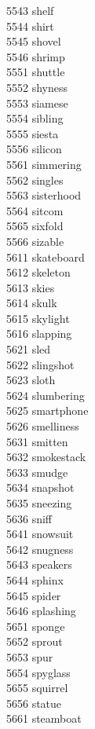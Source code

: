 5543 shelf \\
5544 shirt \\
5545 shovel \\
5546 shrimp \\
5551 shuttle \\
5552 shyness \\
5553 siamese \\
5554 sibling \\
5555 siesta \\
5556 silicon \\
5561 simmering \\
5562 singles \\
5563 sisterhood \\
5564 sitcom \\
5565 sixfold \\
5566 sizable \\
5611 skateboard \\
5612 skeleton \\
5613 skies \\
5614 skulk \\
5615 skylight \\
5616 slapping \\
5621 sled \\
5622 slingshot \\
5623 sloth \columnbreak \\
5624 slumbering \\
5625 smartphone \\
5626 smelliness \\
5631 smitten \\
5632 smokestack \\
5633 smudge \\
5634 snapshot \\
5635 sneezing \\
5636 sniff \\
5641 snowsuit \\
5642 snugness \\
5643 speakers \\
5644 sphinx \\
5645 spider \\
5646 splashing \\
5651 sponge \\
5652 sprout \\
5653 spur \\
5654 spyglass \\
5655 squirrel \\
5656 statue \\
5661 steamboat \\
